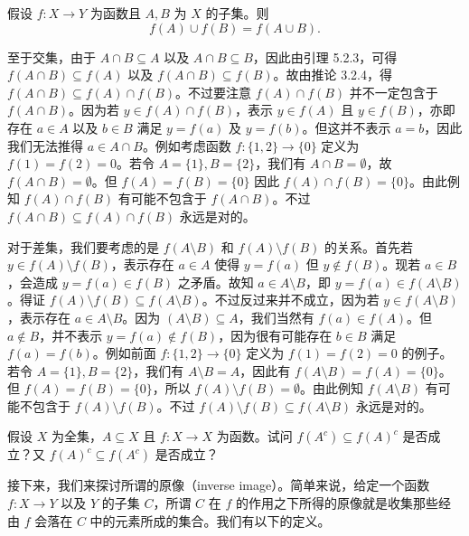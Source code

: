 \begin{proposition}
假设 $f : X \to Y$ 为函数且 $A, B$ 为 $X$ 的子集。则
$$ f(A) \cup f(B) = f(A \cup B). $$
\end{proposition}

至于交集，由于 $A \cap B \subseteq A$ 以及 $A \cap B \subseteq B$，因此由引理 5.2.3，可得 $f(A \cap B) \subseteq f(A)$ 以及 $f(A \cap B) \subseteq f(B)$。故由推论 3.2.4，得 $f(A \cap B) \subseteq f(A) \cap f(B)$。不过要注意 $f(A) \cap f(B)$ 并不一定包含于 $f(A \cap B)$。因为若 $y \in f(A) \cap f(B)$，表示 $y \in f(A)$ 且 $y \in f(B)$，亦即存在 $a \in A$ 以及 $b \in B$ 满足 $y = f(a)$ 及 $y = f(b)$。但这并不表示 $a = b$，因此我们无法推得 $a \in A \cap B$。例如考虑函数 $f : \{1, 2\} \to \{0\}$ 定义为 $f(1) = f(2) = 0$。若令 $A = \{1\}, B = \{2\}$，我们有 $A \cap B = \emptyset$，故 $f(A \cap B) = \emptyset$。但 $f(A) = f(B) = \{0\}$ 因此 $f(A) \cap f(B) = \{0\}$。由此例知 $f(A) \cap f(B)$ 有可能不包含于 $f(A \cap B)$。不过 $f(A \cap B) \subseteq f(A) \cap f(B)$ 永远是对的。

对于差集，我们要考虑的是 $f(A \setminus B)$ 和 $f(A) \setminus f(B)$ 的关系。首先若 $y \in f(A) \setminus f(B)$，表示存在 $a \in A$ 使得 $y = f(a)$ 但 $y \notin f(B)$。现若 $a \in B$，会造成 $y = f(a) \in f(B)$ 之矛盾。故知 $a \in A \setminus B$，即 $y = f(a) \in f(A \setminus B)$。得证 $f(A) \setminus f(B) \subseteq f(A \setminus B)$。不过反过来并不成立，因为若 $y \in f(A \setminus B)$，表示存在 $a \in A \setminus B$。因为 $(A \setminus B) \subseteq A$，我们当然有 $f(a) \in f(A)$。但 $a \notin B$，并不表示 $y = f(a) \notin f(B)$，因为很有可能存在 $b \in B$ 满足 $f(a) = f(b)$。例如前面 $f : \{1, 2\} \to \{0\}$ 定义为 $f(1) = f(2) = 0$ 的例子。若令 $A = \{1\}, B = \{2\}$，我们有 $A \setminus B = A$，因此有 $f(A \setminus B) = f(A) = \{0\}$。但 $f(A) = f(B) = \{0\}$，所以 $f(A) \setminus f(B) = \emptyset$。由此例知 $f(A \setminus B)$ 有可能不包含于 $f(A) \setminus f(B)$。不过 $f(A) \setminus f(B) \subseteq f(A \setminus B)$ 永远是对的。

\begin{question}
假设 $X$ 为全集，$A \subseteq X$ 且 $f : X \to X$ 为函数。试问 $f(A^c) \subseteq f(A)^c$ 是否成立？又 $f(A)^c \subseteq f(A^c)$ 是否成立？
\end{question}

接下来，我们来探讨所谓的原像（inverse image）。简单来说，给定一个函数 $f : X \to Y$ 以及 $Y$ 的子集 $C$，所谓 $C$ 在 $f$ 的作用之下所得的原像就是收集那些经由 $f$ 会落在 $C$ 中的元素所成的集合。我们有以下的定义。

